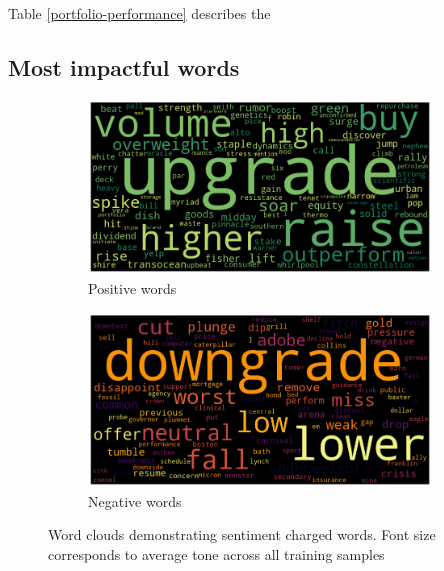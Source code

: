 \documentclass[ oneside,%
                    author={Joshua Felmeden},
                    degree={MEng},
                     title={Semantic Analysis of Financial Headlines Based on Realised Stock Returns},
                  subtitle={}]{dissertation}
\begin{document}
Table \ref{portfolio-performance} describes the 




\subsection{Most impactful words}
\begin{figure}[ht]
\begin{subfigure}[b]{\textwidth}
\centering
\includegraphics[scale=0.4]{pics/positive.png}
\caption{Positive words}
\end{subfigure}

\begin{subfigure}[b]{\textwidth}
\centering
\includegraphics[scale=0.4]{pics/negative.png}
\caption{Negative words}
\end{subfigure}
\caption{Word clouds demonstrating sentiment charged words. Font size corresponds to average tone across all training samples}
\label{wordclouds}
\end{figure}
\end{document}
